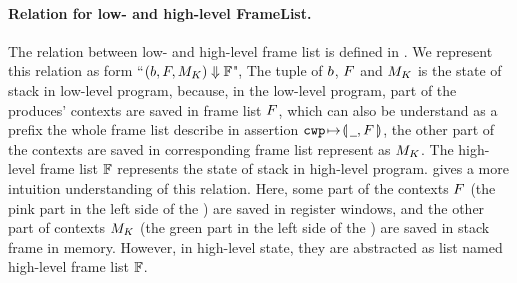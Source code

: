 \paragraph{\bf Relation for low- and high-level FrameList.} 
The relation between low- and high-level frame list is defined in 
\Fig{\ref{fig:relation-low-high-level-framelist}}. We represent 
this relation as form 
``${(b, F, M_K)} \Downarrow {\mathbb{F}}$", 
The tuple of $b$, 
$F$ and $M_K$ is the state of stack in low-level program, 
because, in the low-level program, part of the produces' contexts are 
saved in frame list $F$, which can also be understand as a 
prefix the whole frame list describe in assertion $\texttt{cwp}\!\mapsto\!\llparenthesis\, \underline{\ \,},F\,\rrparenthesis$, 
the other part of the contexts are saved in corresponding frame list 
represent as $M_K$. The high-level frame list $\mathbb{F}$ represents the 
state of stack in high-level program. 
\Fig{\ref{fig:Abstraction of Register Windows and Memory}} gives a 
more intuition understanding of this relation. Here, some part of 
the contexts $F$ (the pink part in the left side of the 
\Fig{\ref{fig:Abstraction of Register Windows and Memory}}) 
are saved in register windows, and the other part of contexts 
$M_K$ (the green part in the left side of the 
\Fig{\ref{fig:Abstraction of Register Windows and Memory}}) are 
saved in stack frame in memory. However, in high-level state, 
they are abstracted as list named high-level frame list $\mathbb{F}$. 


